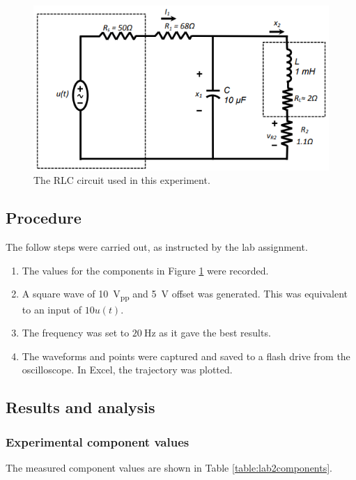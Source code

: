 \documentclass{report}
\newcommand{\pp}{_{pp}}
\newcommand{\Vpp}{\V\pp}
\begin{document}
\begin{figure}[h]
	\centering
	\includegraphics[width=0.6\linewidth]{rlccircuit}
	\caption{The RLC circuit used in this experiment.}
	\label{fig:rlccircuit}
\end{figure}

\subsection{Procedure}
The follow steps were carried out, as instructed by the lab assignment.
\begin{enumerate}
	\item The values for the components in Figure \ref{fig:rlccircuit} were recorded.
	\item A square wave of \SI{10}{\Vpp} and \SI{5}{\V} offset was generated. This was equivalent to an input of $10 u(t)$.
	\item The frequency was set to $\SI{20}{\Hz}$ as it gave the best results.
	\item The waveforms and points were captured and saved to a flash drive from the oscilloscope. In Excel, the trajectory was plotted.
\end{enumerate}

\subsection{Results and analysis}

\subsubsection{Experimental component values}
The measured component values are shown in Table \ref{table:lab2components}.
\end{document}
